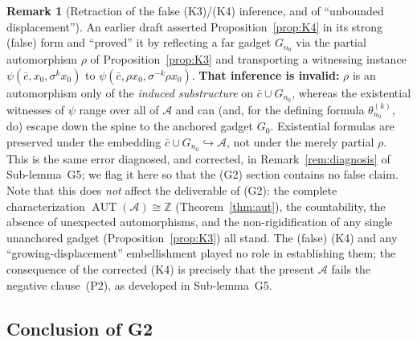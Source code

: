 \documentclass[12pt,fullpage]{article}
\theoremstyle{definition}
\newtheorem{remark}[theorem]{Remark}
\newcommand{\A}{\mathcal{A}}
\newcommand{\Z}{{\mathbb{Z}}}
\newcommand{\AUT}{\operatorname{AUT}}
\begin{document}
\begin{remark}[Retraction of the false (K3)/(K4) inference, and of ``unbounded displacement'']\label{rem:K4-honest}
An earlier draft asserted Proposition~\ref{prop:K4} in its strong (false) form
and ``proved'' it by reflecting a far gadget $G_{n_0}$ via the partial
automorphism $\rho$ of Proposition~\ref{prop:K3} and transporting a witnessing
instance $\psi(\bar c,x_0,\sigma^k x_0)$ to $\psi(\bar c,\rho x_0,\sigma^{-k}\rho x_0)$.
\textbf{That inference is invalid:} $\rho$ is an automorphism only of the
\emph{induced substructure} on $\bar c\cup G_{n_0}$, whereas the existential
witnesses of $\psi$ range over all of $\A$ and can (and, for the defining
formula $\theta_{n_0}^{(k)}$, do) escape down the spine to the anchored gadget
$G_0$.  Existential formulas are preserved under the embedding
$\bar c\cup G_{n_0}\hookrightarrow\A$, not under the merely partial $\rho$.
This is the same error diagnosed, and corrected, in
Remark~\ref{rem:diagnosis} of Sub-lemma~G5; we flag it here so that the (G2)
section contains no false claim.  Note that this does \emph{not} affect the
deliverable of (G2): the complete characterization $\AUT(\A)\cong\Z$
(Theorem~\ref{thm:aut}), the countability, the absence of unexpected
automorphisms, and the non-rigidification of any single unanchored gadget
(Proposition~\ref{prop:K3}) all stand.  The (false) (K4) and any
``growing-displacement'' embellishment played no role in establishing them; the
consequence of the corrected (K4) is precisely that the present $\A$ fails the
negative clause~(P2), as developed in Sub-lemma~G5.
\end{remark}


\subsection*{Conclusion of G2}
\end{document}

